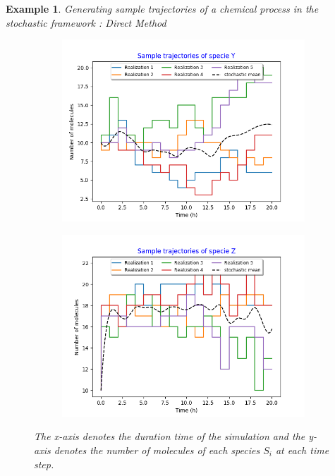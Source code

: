 \documentclass[11pt,a4paper]{article}
\newtheorem{example}[theorem]{Example}
\begin{document}
\begin{example}{Generating sample trajectories of a chemical process in the stochastic framework : Direct Method}
\begin{figure}[!h]
    \centering
    \begin{subfigure}{.5\textwidth}
      \centering
        \includegraphics[width=1.1\linewidth]{Images/y_5.png}
        \label{fig: Single sample trajectory}
    \end{subfigure}%
    \begin{subfigure}{.5\textwidth}
      \centering
        \includegraphics[width=1.1\linewidth]{Images/z_5.png}
        \label{fig: Single sample trajectory}
    \end{subfigure}
    \caption{The x-axis denotes the duration time of the simulation and the y-axis denotes the number of molecules of each species $S_{i}$ at each time step.}
    \end{figure}
\end{example}
\end{document}
